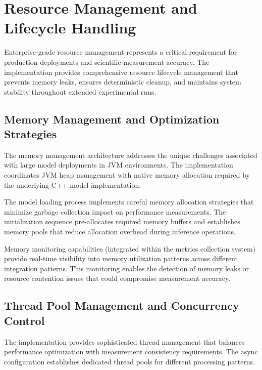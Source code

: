 
\section{Resource Management and Lifecycle Handling}

Enterprise-grade resource management represents a critical requirement for production deployments and scientific measurement accuracy. The implementation provides comprehensive resource lifecycle management that prevents memory leaks, ensures deterministic cleanup, and maintains system stability throughout extended experimental runs.

\subsection{Memory Management and Optimization Strategies}

The memory management architecture addresses the unique challenges associated with large model deployments in JVM environments. The implementation coordinates JVM heap management with native memory allocation required by the underlying C++ model implementation.

The model loading process implements careful memory allocation strategies that minimize garbage collection impact on performance measurements. The initialization sequence pre-allocates required memory buffers and establishes memory pools that reduce allocation overhead during inference operations.


Memory monitoring capabilities (integrated within the metrics collection system) provide real-time visibility into memory utilization patterns across different integration patterns. This monitoring enables the detection of memory leaks or resource contention issues that could compromise measurement accuracy.

\subsection{Thread Pool Management and Concurrency Control}

The implementation provides sophisticated thread management that balances performance optimization with measurement consistency requirements. The async configuration establishes dedicated thread pools for different processing patterns.

